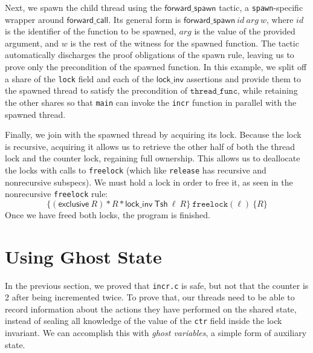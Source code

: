\documentclass[11pt]{article}
\begin{document}
Next, we spawn the child thread using the $\mathsf{forward\_spawn}$ tactic, a \texttt{spawn}-specific wrapper around $\mathsf{forward\_call}$. Its general form is $\mathsf{forward\_spawn}\ \mathit{id}\ \mathit{arg}\ \mathit{w}$, where $\mathit{id}$ is the identifier of the function to be spawned, $\mathit{arg}$ is the value of the provided argument, and $\mathit{w}$ is the rest of the witness for the spawned function. The tactic automatically discharges the proof obligations of the spawn rule, leaving us to prove only the precondition of the spawned function. In this example, we split off a share of the \texttt{lock} field and each of the $\mathsf{lock\_inv}$ assertions and provide them to the spawned thread to satisfy the precondition of $\mathtt{thread\_func}$, while retaining the other shares so that \texttt{main} can invoke the \texttt{incr} function in parallel with the spawned thread.

Finally, we join with the spawned thread by acquiring its lock. Because the lock is recursive, acquiring it allows us to retrieve the other half of both the thread lock and the counter lock, regaining full ownership. This allows us to deallocate the locks with calls to \texttt{freelock} (which like \texttt{release} has recursive and nonrecursive subspecs). We must hold a lock in order to free it, as seen in the nonrecursive \texttt{freelock} rule:
$$\{(\mathsf{exclusive}\ R) * R * \mathsf{lock\_inv}\ \mathsf{Tsh}\ \ell\ R\}\ \texttt{freelock}(\ell)\ \{R\}$$
Once we have freed both locks, the program is finished.

\section{Using Ghost State}
\label{ghost}
In the previous section, we proved that \texttt{incr.c} is safe, but not that the counter is 2 after being incremented twice. To prove that, our threads need to be able to record information about the actions they have performed on the shared state, instead of sealing all knowledge of the value of the \texttt{ctr} field inside the lock invariant. We can accomplish this with \emph{ghost variables}, a simple form of auxiliary state.
\end{document}
